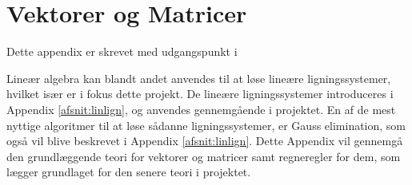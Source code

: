 \chapter{Vektorer og Matricer}
Dette appendix er skrevet med udgangspunkt i \citep{lial}

Lineær algebra kan blandt andet anvendes til at løse lineære ligningssystemer, hvilket især er i fokus dette projekt. De lineære ligningssystemer introduceres i Appendix \ref{afsnit:linlign}, og anvendes gennemgående i projektet.
En af de mest nyttige algoritmer til at løse sådanne ligningssystemer, er Gauss elimination, som også vil blive beskrevet i Appendix \ref{afsnit:linlign}. 
Dette Appendix vil gennemgå den grundlæggende teori for vektorer og matricer samt regneregler for dem, som lægger grundlaget for den senere teori i projektet.


%


